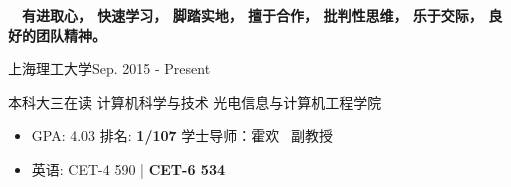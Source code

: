 \documentclass{sorahjy_cv}
\begin{document}
\pagestyle{empty}


\begin{cvHeader}
\end{cvHeader}


%
%

\begin{description}{}
	\item{\ \ }\textbf{有进取心， 快速学习， 脚踏实地， 擅于合作， 批判性思维， 乐于交际， 良好的团队精神。}
\end{description}


%
%

\begin{sectionContentSimple}{上海理工大学}{Sep. 2015 - Present}
	\item 本科大三在读 \quad 计算机科学与技术 \quad 光电信息与计算机工程学院
	\begin{itemize}
		\item GPA: 4.03 \quad 排名: \textbf{1/107} \quad 学士导师：霍欢 \ 副教授
		\item 英语: CET-4 590 | \textbf{CET-6 534}
	\end{itemize}
\end{sectionContentSimple}

%
%




\end{document}
